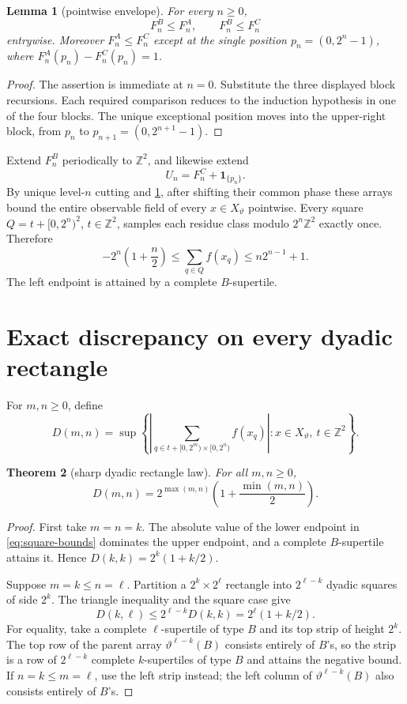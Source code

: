 \documentclass[11pt,a4paper]{amsart}
\newtheorem{theorem}{Theorem}[section]
\newtheorem{lemma}[theorem]{Lemma}
\theoremstyle{definition}
\theoremstyle{remark}
\newcommand{\Z}{\mathbb Z}
\begin{document}
\begin{lemma}[pointwise envelope]\label{lem:envelope}
For every $n\geq0$,
\[
 F_n^B\leq F_n^A,\qquad F_n^B\leq F_n^C
\]
entrywise.  Moreover $F_n^A\leq F_n^C$ except at the single position
$p_n=(0,2^n-1)$, where $F_n^A(p_n)-F_n^C(p_n)=1$.
\end{lemma}

\begin{proof}
The assertion is immediate at $n=0$.  Substitute the three displayed block
recursions.  Each required comparison reduces to the induction hypothesis in
one of the four blocks.  The unique exceptional position moves into the
upper-right block, from $p_n$ to $p_{n+1}=(0,2^{n+1}-1)$.
\end{proof}

Extend $F_n^B$ periodically to $\Z^2$, and likewise extend
\[
 U_n=F_n^C+\mathbf1_{\{p_n\}}.
\]
By unique level-$n$ cutting and \cref{lem:envelope}, after shifting their
common phase these arrays bound the entire observable field of every
$x\in X_\vartheta$ pointwise.  Every square
$Q=t+[0,2^n)^2$, $t\in\Z^2$, samples each residue class modulo
$2^n\Z^2$ exactly once.  Therefore
\begin{equation}\label{eq:square-bounds}
 -2^n\left(1+\frac n2\right)
 \leq \sum_{q\in Q}f(x_q)
 \leq n2^{n-1}+1.
\end{equation}
The left endpoint is attained by a complete $B$-supertile.

\section{Exact discrepancy on every dyadic rectangle}

For $m,n\geq0$, define
\[
 D(m,n)=\sup\left\{
 \left|\sum_{q\in t+[0,2^m)\times[0,2^n)}f(x_q)\right|:
 x\in X_\vartheta,\ t\in\Z^2
 \right\}.
\]

\begin{theorem}[sharp dyadic rectangle law]\label{thm:rectangle}
For all $m,n\geq0$,
\begin{equation}\label{eq:rectangle}
 D(m,n)=2^{\max(m,n)}
 \left(1+\frac{\min(m,n)}2\right).
\end{equation}
\end{theorem}

\begin{proof}
First take $m=n=k$.  The absolute value of the lower endpoint in
\eqref{eq:square-bounds} dominates the upper endpoint, and a complete
$B$-supertile attains it.  Hence
$D(k,k)=2^k(1+k/2)$.

Suppose $m=k\leq n=\ell$.  Partition a
$2^k\times2^\ell$ rectangle into $2^{\ell-k}$ dyadic squares of side $2^k$.
The triangle inequality and the square case give
\[
 D(k,\ell)\leq2^{\ell-k}D(k,k)=2^\ell(1+k/2).
\]
For equality, take a complete $\ell$-supertile of type $B$ and its top strip
of height $2^k$.  The top row of the parent array
$\vartheta^{\ell-k}(B)$ consists entirely of $B$'s, so the strip is a row of
$2^{\ell-k}$ complete $k$-supertiles of type $B$ and attains the negative
bound.  If $n=k\leq m=\ell$, use the left strip instead; the left column of
$\vartheta^{\ell-k}(B)$ also consists entirely of $B$'s.
\end{proof}
\end{document}
